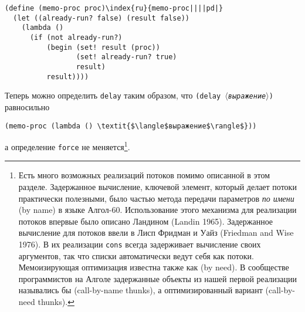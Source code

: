 \begin{Verbatim}[fontsize=\small]
(define (memo-proc proc)\index{ru}{memo-proc||||pd|}
  (let ((already-run? false) (result false))
    (lambda ()
      (if (not already-run?)
          (begin (set! result (proc))
                 (set! already-run? true)
                 result)
          result))))
\end{Verbatim}
Теперь можно определить {\tt delay} таким образом, что
{\tt (delay \textit{$\langle$выражение$\rangle$})} равносильно

\begin{Verbatim}[fontsize=\small]
(memo-proc (lambda () \textit{$\langle$выражение$\rangle$}))
\end{Verbatim}
а определение {\tt force} не меняется\footnote{Есть много возможных реализаций потоков помимо
описанной в этом разделе.  Задержанное вычисление, ключевой элемент,
который делает потоки практически полезными, было частью метода
передачи параметров
%
%
{\em по имени} (by name) в языке
Алгол-60.  Использование этого механизма для реализации потоков
впервые было описано Ландином (Landin 1965).
%
Задержанное вычисление для потоков ввели в Лисп Фридман и Уайз
(Friedman and Wise 1976).
%
%
%
В их реализации
{\tt cons} всегда задерживает вычисление своих аргументов, так
что списки автоматически ведут себя как потоки.  Мемоизирующая
оптимизация известна также как
 (by need).  В
сообществе программистов на Алголе задержанные объекты из нашей первой
реализации назывались бы
%
%
%
%
 (call-by-name thunks), а оптимизированный вариант
 (call-by-need thunks).
}.
